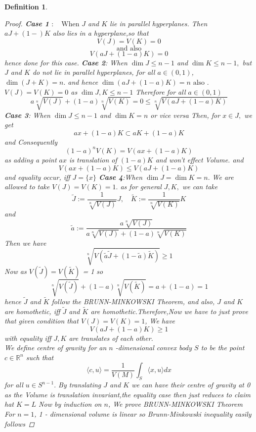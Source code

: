 \documentclass[oneside]{book}
\newtheorem{mydef}{Definition}
\begin{document}
\begin{mydef}
\begin{proof}
\textbf{Case 1} $: \quad \text{When } J$ and $K$ lie in parallel hyperplanes. Then  $a J+(1-) K$  also lies in a hyperplane,\quad so that $$V(J)=V(K)=0$$    $$\text{and also}$$ $$V(a J+(1-a) K)=0$$
 hence done for this case.
 \hfill \break
\textbf{Case 2}: \quad  When $\operatorname{dim} J \leq n-1$ and $\operatorname{dim} K \leq n-1,$ but $J$ and $K$ do not lie in parallel hyperplanes, for all $a \in(0,1)$, $\operatorname{dim}(J+K)=n .$ and hence  $\operatorname{dim}(a J+(1-a) K)=n \text{ also }.$ 
\hfill \break
$V(J) = V(K)= 0$ as $\operatorname{dim} J,K \leq n-1 $ Therefore for all $a \in(0,1)$
 $$
a \sqrt[n]{V(J)}+(1-a) \sqrt[n]{V(K)}=0 \leq \sqrt[n]{V(a J+(1-a) K)}
$$
\hfill \break
\textbf{Case 3}: \quad  When $\operatorname{dim } J \leq n-1$ and $\operatorname{dim} K=n$ or vice versa
\hfill \break 
Then, for $x \in J,$ we get
\[
a x+(1-a) K \subset a K+(1-a) K
\]
and Consequently
\[
(1-a)^{n} V(K)=V(a x+(1-a) K) 
\]
as adding a point $a x $ is translation of $(1-a) K$ and won't effect Volume. 
and
$$ V(a x+(1-a) K) \leq V(a 
J+(1-a) K)$$
and equality occur, iff $J=\{x\}$ 
\hfill \break
\textbf{Case 4}:When $\operatorname{dim} J=\operatorname{dim} K=n .$  We are allowed to take $V(J)=V(K)=1 .$ as for general $J, K,$  we  can take
\[
  \widetilde{J}:=\frac{1}{\sqrt[n]{V(J)}} J, \quad \widetilde{K}:=\frac{1}{\sqrt[n]{V(K)}} K
\]
and
\[
\widetilde{a}:=\frac{a \sqrt[n]{V(J)}}{a \sqrt[n]{V(J)}+(1-a) \sqrt[n]{V(K)}}
\]
Then we have
\[
    \sqrt[n]{V({\widetilde{a} \widetilde{ J} }+(1-\widetilde{a}) \widetilde{K})} \geq 1
\]
Now  as $V(\widetilde{J}) = V(\widetilde{K})$ = 1 so $$\sqrt[n]{V(\widetilde{J})}+(1-a) \sqrt[n]{V(\widetilde {K})}=a+(1-a)=1$$
hence $\widetilde{J}$ and $\widetilde{K}$
follow the BRUNN-MINKOWSKI Theorem,  and also, $J$ and $K$ are homothetic, iff $\widetilde{J}$ and $\widetilde{K}$ are homothetic.Therefore,Now  we have to just prove that given condition that $V(J)=V(K)=1$, We have 
\[
V(a J+(1-a) K) \geq 1
\]
with equality iff $J, K$ are translates of each other.
\\
 We define centre of gravity for an $n$ -dimensional convex body $S$ to be the point $c \in \mathbb{R}^{n}$ such that
\[
\langle c, u\rangle=\frac{1}{V(M)} \int_{S}\langle x, u\rangle d x
\]
for all $u \in S^{n-1} .$ 
By translating  $J$ and $K$ we can have their centre of gravity at 0 as the Volume is translation invariant,the equality case then just reduces to claim hat $K=L$
\hfill \break
Now by induction on $n$, We prove  BRUNN-MINKOWSKI Theorem 
\hfill \break
For $n=1$, 1 - dimensional volume is linear so Brunn-Minkowski inequality easily follows   

\end{proof}
\end{mydef}
\end{document}
